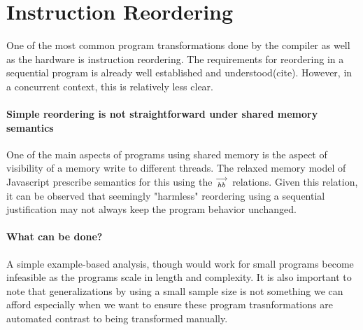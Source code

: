

\newtheorem{lemma}{Lemma}

\newtheorem{theorem}{Theorem}[lemma]

\newtheorem{corollary}{Corollary}[theorem]

\newtheorem{definition}{Definition}



\section{Instruction Reordering}
    One of the most common program transformations done by the compiler as well as the hardware is instruction reordering. The requirements for reordering in a sequential program is already well established and understood(cite). However, in a concurrent context, this is relatively less clear. 
    
    \paragraph{Simple reordering is not straightforward under shared memory semantics}
    One of the main aspects of programs using shared memory is the aspect of visibility of a memory write to different threads. The relaxed memory model of Javascript prescribe semantics for this using the $\stackrel{\longrightarrow}{_{hb}}$ relations. Given this relation, it can be observed that seemingly "harmless" reordering using a sequential justification may not always keep the program behavior unchanged. 
    
    
    \paragraph{What can be done?}
    A simple example-based analysis, though would work for small programs become infeasible as the programs scale in length and complexity. It is also important to note that generalizations by using a small sample size is not something we can afford especially when we want to ensure these program trasnformations are automated contrast to being transformed manually.
    
